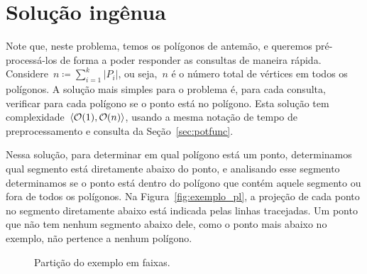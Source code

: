 \documentclass[main.tex]{subfiles}
\begin{document}
\section{Solução ingênua}

Note que, neste problema, temos os polígonos de antemão, e queremos pré-processá-los de forma a poder responder as consultas de maneira rápida. Considere~${n \coloneqq \sum\limits_{i = 1}^k{|P_i|}}$, ou seja,~$n$ é o número total de vértices em todos os polígonos. A solução mais simples para o problema é, para cada consulta, verificar para cada polígono se o ponto está no polígono. Esta solução tem complexidade~$\langle\mathcal{O}(1), \mathcal{O}(n)\rangle$, usando a mesma notação de tempo de preprocessamento e consulta da Seção~\ref{sec:potfunc}.

Nessa solução, para determinar em qual polígono está um ponto, determinamos qual segmento está diretamente abaixo do ponto, e analisando esse segmento determinamos se o ponto está dentro do polígono que contém aquele segmento ou fora de todos os polígonos. Na Figura~\ref{fig:exemplo_pl}, a projeção de cada ponto no segmento diretamente abaixo está indicada pelas linhas tracejadas. Um ponto que não tem nenhum segmento abaixo dele, como o ponto mais abaixo no exemplo, não pertence a nenhum polígono.

\begin{figure}
\centering
{}
\caption{Partição do exemplo em faixas.} \label{fig:slabs}
\end{figure}
\end{document}
